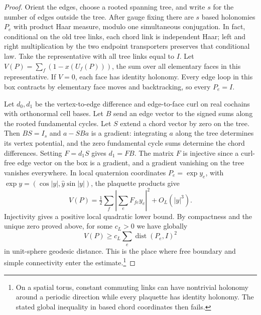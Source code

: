 \begin{proof}
Orient the edges, choose a rooted spanning tree, and write \(s\) for the
number of edges outside the tree. After gauge fixing there are \(s\) based
holonomies \(P_e\) with product Haar measure, modulo one simultaneous
conjugation. In fact, conditional on the old tree links, each chord link
is independent Haar; left and right multiplication by the two endpoint
transporters preserves that conditional law. Take the representative with
all tree links equal to \(I\). Let \(V(P)=\sum_f(1-x(U_f(P)))\), the sum
over all elementary faces in this representative. If \(V=0\), each face
has identity holonomy. Every edge loop in this box contracts by elementary
face moves and backtracking, so every \(P_e=I\).

Let \(d_0,d_1\) be the vertex-to-edge difference and edge-to-face curl
on real cochains with orthonormal cell bases. Let \(B\) send an edge
vector to the signed sums along the rooted fundamental cycles. Let \(S\)
extend a chord vector by zero on the tree. Then \(BS=I_s\) and
\(a-SBa\) is a gradient: integrating \(a\) along the tree determines its
vertex potential, and the zero fundamental cycle sums determine the
chord differences. Setting \(F=d_1 S\) gives \(d_1=FB\).
The matrix \(F\) is injective since a curl-free edge vector on the box is
a gradient, and a gradient vanishing on the tree vanishes everywhere.
In local quaternion coordinates \(P_e=\exp y_e\), with
\(\exp y=(\cos|y|,\widehat y\sin|y|)\), the plaquette products give
\[
 V(P)=\tfrac12\sum_f\left|\sum_e F_{fe}y_e\right|^2+O_L(|y|^3).
\]
Injectivity gives a positive local quadratic lower bound. By compactness
and the unique zero proved above, for some \(c_L>0\) we have globally
\[
 V(P)\ge c_L\sum_e \operatorname{dist}(P_e,I)^2
\]
in unit-sphere geodesic distance. This is the place where free boundary
and simple connectivity enter the estimate.\footnote{On a spatial torus,
constant commuting links can have nontrivial holonomy around a periodic
direction while every plaquette has identity holonomy. The stated global
inequality in based chord coordinates then fails.}


\end{proof}
